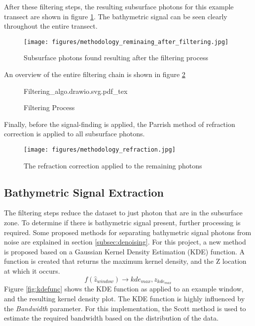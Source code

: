 After these filtering steps, the resulting subsurface photons for this example transect are shown in figure \ref{fig:remaing_photons}. The bathymetric signal can be seen clearly throughout the entire transect.

\begin{figure}[h!]
    \centering
    \texttt{[image: figures/methodology\_reminaing\_after\_filtering.jpg]}
    \caption{Subsurface photons found resulting after the filtering process}
    \label{fig:remaing_photons}
\end{figure}

An overview of the entire filtering chain is shown in figure \ref{fig:filtering-flowchart}

\begin{figure}[h!]
    \centering
    {Filtering_algo.drawio.svg.pdf_tex}
    \caption{Filtering Process}
    \label{fig:filtering-flowchart}
\end{figure}

Finally, before the signal-finding is applied, the Parrish method of refraction correction is applied to all subsurface photons.

\begin{figure}[htbp]
    \centering
    \texttt{[image: figures/methodology\_refraction.jpg]}
    \caption{The refraction correction applied to the remaining photons}
    \label{fig:refraction-photons}
\end{figure}

\subsection{Bathymetric Signal Extraction}\label{sec:kdesignalfinding}

The filtering steps reduce the dataset to just photon that are in the subsurface zone. To determine if there is bathymetric signal present, further processing is required. Some proposed methods for separating bathymetric signal photons from noise are explained in section \ref{subsec:denoising}. For this project, a new method is proposed based on a Gaussian Kernel Density Estimation (KDE) function. A function is created that returns the maximum kernel density, and the Z location at which it occurs. $$ f(\hat{z}_{window}) \rightarrow kde_{max},z_{kde_{max}} $$ Figure \ref{fig:kdefunc} shows the KDE function as applied to an example window, and the resulting kernel density plot. The KDE function is highly influenced by the \emph{Bandwidth} parameter. For this implementation, the Scott method \parencite{Scott2015} is used to estimate the required bandwidth based on the distribution of the data. 

